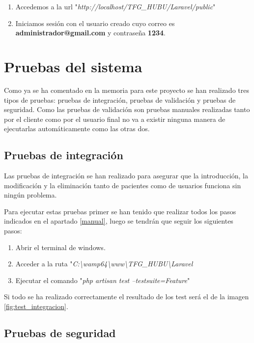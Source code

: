 \begin{enumerate}
    \item Accedemos a la url "\textit{http://localhost/TFG\_HUBU/Laravel/public}"
    \item Iniciamos sesión con el usuario creado cuyo correo es \textbf{administrador@gmail.com} y contraseña \textbf{1234}.
\end{enumerate}

\section{Pruebas del sistema}

Como ya se ha comentado en la memoria para este proyecto se han realizado tres tipos de pruebas: pruebas de integración, pruebas de validación y pruebas de seguridad. Como las pruebas de validación son pruebas manuales realizadas tanto por el cliente como por el usuario final no va a existir ninguna manera de ejecutarlas automáticamente como las otras dos.

\subsection{Pruebas de integración}

Las pruebas de integración se han realizado para asegurar que la introducción, la modificación y la eliminación tanto de pacientes como de usuarios funciona sin ningún problema.

Para ejecutar estas pruebas primer se han tenido que realizar todos los pasos indicados en el apartado \ref{manual}, luego se tendrán que seguir los siguientes pasos:

\begin{enumerate}
    \item Abrir el terminal de windows.
    \item Acceder a la ruta "\textit{C:\textbackslash{}wamp64\textbackslash{}www\textbackslash{}TFG\_HUBU\textbackslash{}Laravel}
    \item Ejecutar el comando "\textit{php artisan test --testsuite=Feature}"
\end{enumerate}

\newpage

Si todo se ha realizado correctamente el resultado de los test será el de la imagen \ref{fig:test_integracion}.


\subsection{Pruebas de seguridad}

